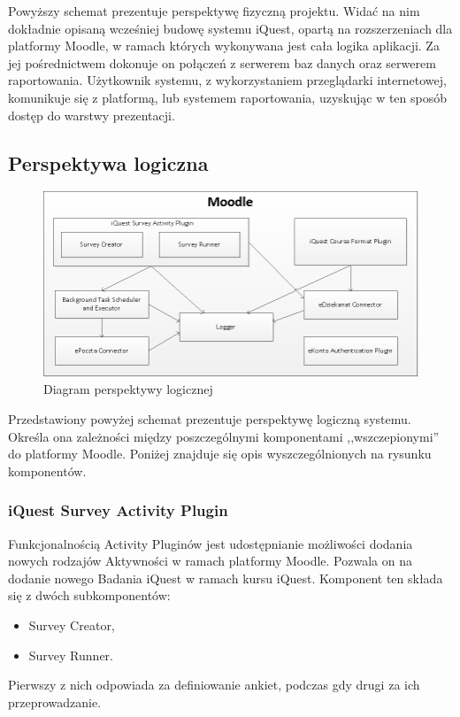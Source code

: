 Powyższy schemat prezentuje perspektywę fizyczną projektu. Widać na nim dokładnie opisaną wcześniej budowę systemu iQuest, opartą na rozszerzeniach dla platformy Moodle, w ramach których wykonywana jest cała logika aplikacji. Za jej pośrednictwem dokonuje on połączeń z serwerem baz danych oraz serwerem raportowania. Użytkownik systemu, z wykorzystaniem przeglądarki internetowej, komunikuje się z platformą, lub systemem raportowania, uzyskując w ten sposób dostęp do warstwy prezentacji.

\subsection{Perspektywa logiczna}
\label{Chapter532}

\begin{figure}[H]
\centering\includegraphics[width=15cm]{figures/LogicalView}
\caption{Diagram perspektywy logicznej}\label{rys:PerspektywaLogiczna}
\end{figure}

Przedstawiony powyżej schemat prezentuje perspektywę logiczną systemu. Określa ona zależności między poszczególnymi komponentami ,,wszczepionymi'' do platformy Moodle. Poniżej znajduje się opis wyszczególnionych na rysunku komponentów.

\subsubsection{iQuest Survey Activity Plugin}
\label{Chapter5321}
Funkcjonalnością Activity Pluginów jest udostępnianie możliwości dodania nowych rodzajów Aktywności w ramach platformy Moodle. Pozwala on na dodanie nowego Badania iQuest w ramach kursu iQuest. Komponent ten składa się z dwóch subkomponentów:
\begin{itemize}
\item{Survey Creator,}
\item{Survey Runner.}
\end{itemize}
Pierwszy z nich odpowiada za definiowanie ankiet, podczas gdy drugi za ich przeprowadzanie.

